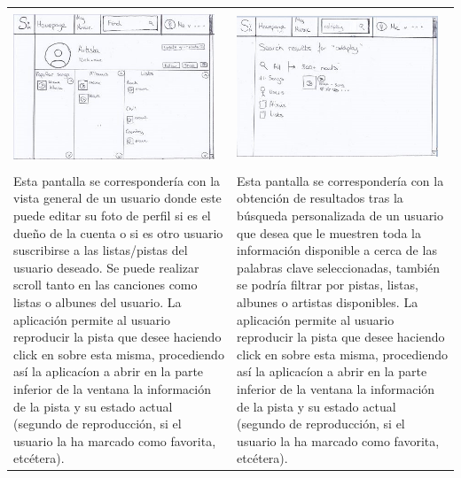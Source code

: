 \begin{tabular}{ p{6cm} p{6cm}}
	\hline
	\\
	\includegraphics[width=6cm]{Figures/web/Artist-web.png}
	&
	\includegraphics[width=6cm]{Figures/web/search-web.png} \\
	\hline
	\\
	Esta pantalla se correspondería con la vista general de un usuario donde este puede editar su foto de perfil si es el dueño de la cuenta o si es otro usuario suscribirse a las listas/pistas del usuario deseado.
	Se puede realizar scroll tanto en las canciones como listas o albunes del usuario.
	La aplicación permite al usuario reproducir la pista que desee haciendo click en sobre esta misma, procediendo así la aplicacíon a abrir en la parte inferior de la ventana la información de la pista y su estado actual (segundo de reproducción, si el usuario la ha marcado como favorita, etcétera).
	&
	Esta pantalla se correspondería con la obtención de resultados tras la búsqueda personalizada de un usuario que desea que le muestren toda la información disponible a cerca de las palabras clave seleccionadas, también se podría filtrar por pistas, listas, albunes o artistas disponibles.
	La aplicación permite al usuario reproducir la pista que desee haciendo click en sobre esta misma, procediendo así la aplicacíon a abrir en la parte inferior de la ventana la información de la pista y su estado actual (segundo de reproducción, si el usuario la ha marcado como favorita, etcétera).
	\\
	\hline
\end{tabular}
